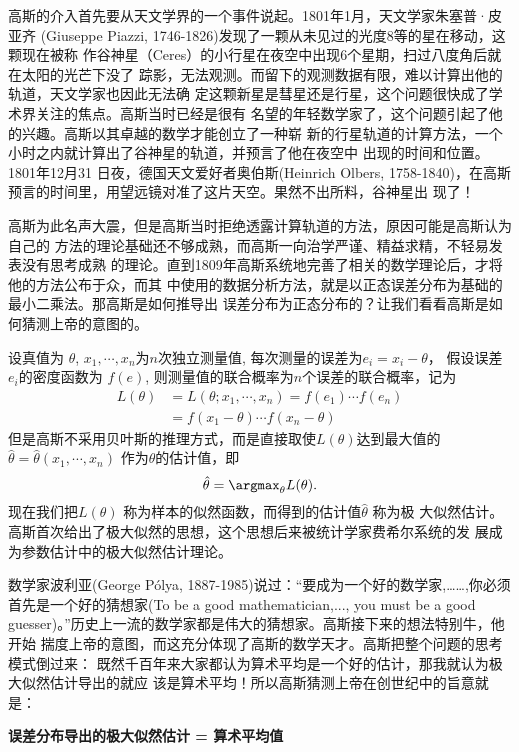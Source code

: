 高斯的介入首先要从天文学界的一个事件说起。1801年1月，天文学家朱塞普·皮亚齐
(Giuseppe Piazzi, 1746-1826)发现了一颗从未见过的光度8等的星在移动，这颗现在被称
作谷神星（Ceres）的小行星在夜空中出现6个星期，扫过八度角后就在太阳的光芒下没了
踪影，无法观测。而留下的观测数据有限，难以计算出他的轨道，天文学家也因此无法确
定这颗新星是彗星还是行星，这个问题很快成了学术界关注的焦点。高斯当时已经是很有
名望的年轻数学家了，这个问题引起了他的兴趣。高斯以其卓越的数学才能创立了一种崭
新的行星轨道的计算方法，一个小时之内就计算出了谷神星的轨道，并预言了他在夜空中
出现的时间和位置。 1801年12月31 日夜，德国天文爱好者奥伯斯(Heinrich Olbers,
1758-1840)，在高斯预言的时间里，用望远镜对准了这片天空。果然不出所料，谷神星出
现了！

高斯为此名声大震，但是高斯当时拒绝透露计算轨道的方法，原因可能是高斯认为自己的
方法的理论基础还不够成熟，而高斯一向治学严谨、精益求精，不轻易发表没有思考成熟
的理论。直到1809年高斯系统地完善了相关的数学理论后，才将他的方法公布于众，而其
中使用的数据分析方法，就是以正态误差分布为基础的最小二乘法。那高斯是如何推导出
误差分布为正态分布的？让我们看看高斯是如何猜测上帝的意图的。

设真值为 $\theta$, $x_1, \cdots, x_n$为$n$次独立测量值, 每次测量的误差为$ e_i = x_i - \theta $，
假设误差$e_i$的密度函数为 $f(e)$, 则测量值的联合概率为$n$个误差的联合概率，记为
\begin{align*}
L(\theta) & = L(\theta;x_1,\cdots,x_n)=f(e_1)\cdots f(e_n) \\
& = f(x_1-\theta)\cdots f(x_n-\theta)
\end{align*}
但是高斯不采用贝叶斯的推理方式，而是直接取使$L(\theta)$达到最大值的
$\hat{\theta}=\hat{\theta}(x_1,\cdots,x_n)$ 作为$\theta$的估计值，即
$$ \hat{\theta}= \argmax_{\theta} L(\theta) .$$
现在我们把$L(\theta)$ 称为样本的似然函数，而得到的估计值$ \hat{\theta}$ 称为极
大似然估计。高斯首次给出了极大似然的思想，这个思想后来被统计学家费希尔系统的发
展成为参数估计中的极大似然估计理论。

数学家波利亚(George P\'{o}lya, 1887-1985)说过：“要成为一个好的数学家,……,你必须
首先是一个好的猜想家(To be a good mathematician,..., you must be a good
guesser)。”历史上一流的数学家都是伟大的猜想家。高斯接下来的想法特别牛，他开始
揣度上帝的意图，而这充分体现了高斯的数学天才。高斯把整个问题的思考模式倒过来：
既然千百年来大家都认为算术平均是一个好的估计，那我就认为极大似然估计导出的就应
该是算术平均！所以高斯猜测上帝在创世纪中的旨意就是：
\begin{center}
\bf{误差分布导出的极大似然估计 = 算术平均值}
\end{center}

